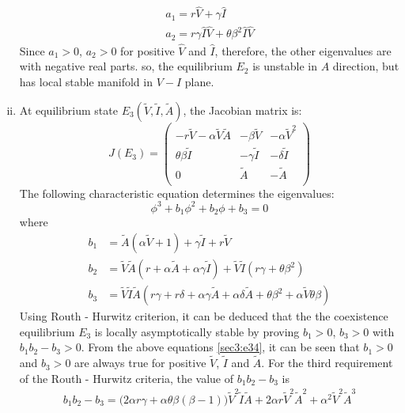 \documentclass[12pt,a4wide]{report}
\numberwithin{equation}{chapter}
\numberwithin{theorem}{chapter}
\begin{document}
\begin{enumerate}[i).]
\begin{align}
a_1=r\hat V+\gamma \hat I\\
a_2=r\gamma \hat I \hat V+\theta \beta^2 \hat I \hat V
\end{align}
Since $a_1>0$, $a_2>0$ for positive $\hat V$ and $\hat I$, therefore, the other eigenvalues are with negative real parts. so, the equilibrium $E_2$ is unstable in $A$ direction, but has local stable manifold in $V-I$ plane.
\item At equilibrium state $E_3(\tilde V, \tilde I, \tilde A)$, the Jacobian matrix is:
\begin{equation}\label{sec3:e33}
J(E_3)=
\left({\begin{matrix}
	-r\tilde V-\alpha \tilde V \tilde A  & -\beta \tilde V & -\alpha \tilde V^2\\
	\theta \beta \tilde I & -\gamma \tilde I & -\delta \tilde I\\
	0 & \tilde A & -\tilde A\\
\end{matrix}}\right)
\end{equation}
The following characteristic equation determines the eigenvalues:
\begin{equation}\label{sec3:e34}
\phi^3+b_1\phi^2+b_2\phi+b_3=0
\end{equation}
where\\
\begin{align}\label{sec3:e34}
b_1&= \tilde A (\alpha \tilde V + 1) + \gamma \tilde I + r\tilde V\\
b_2&= \tilde V \tilde A (r + \alpha \tilde A + \alpha \gamma \tilde I) + \tilde V \tilde I(r\gamma + \theta \beta^2)\\
b_3 &=\tilde V \tilde I \tilde A (r\gamma + r\delta + \alpha \gamma \tilde A + \alpha \delta \tilde A + \theta \beta^2 + \alpha \tilde V \theta \beta)
\end{align}
Using Routh - Hurwitz criterion, it can be deduced that the the coexistence equilibrium $E_3$ is locally asymptotically stable by proving $b_1>0$, $b_3>0$ with $b_1b_2-b_3>0$. From the above equations \eqref{sec3:e34}, it can be seen that $b_1>0$ and $b_3>0$ are always true for positive $\tilde V$, $\tilde I$ and $\tilde A$. For the third requirement of the Routh - Hurwitz criteria, the value of $b_1b_2-b_3$ is
\begin{equation}\label{sec3:e35}
\begin{split}
b_1b_2-b_3 = \bigg(2 \alpha r \gamma + \alpha \theta \beta (\beta - 1)\bigg)\tilde V^2 \tilde I \tilde A  + 2 \alpha r\tilde V^2 \tilde A^2 + \alpha^2\tilde V^2\tilde A^3  \\

\end{split}
\end{equation}
\end{enumerate}
\end{document}
